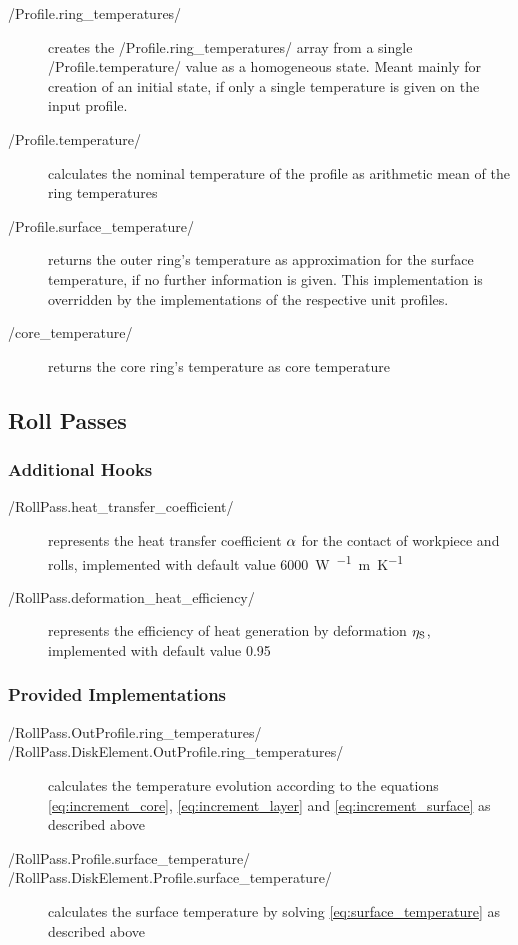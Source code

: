 \documentclass{PyRollDocs}
\begin{document}
    \begin{description}
        \item[\py/Profile.ring_temperatures/] creates the \py/Profile.ring_temperatures/ array from a single \py/Profile.temperature/ value as a homogeneous state.
        Meant mainly for creation of an initial state, if only a single temperature is given on the input profile.
        \item[\py/Profile.temperature/] calculates the nominal temperature of the profile as arithmetic mean of the ring temperatures
        \item[\py/Profile.surface_temperature/] returns the outer ring's temperature as approximation for the surface temperature, if no further information is given.
        This implementation is overridden by the implementations of the respective unit profiles.
        \item[\py/core_temperature/] returns the core ring's temperature as core temperature
    \end{description}

    \subsection{Roll Passes}

    \subsubsection{Additional Hooks}

    \begin{description}
        \item[\py/RollPass.heat_transfer_coefficient/] represents the heat transfer coefficient ${\alpha}$ for the contact of workpiece and rolls, implemented with default value \qty{6000}{\watt\per\squared\meter\per\kelvin}
        \item[\py/RollPass.deformation_heat_efficiency/] represents the efficiency of heat generation by deformation ${\eta_\mathrm{S}}$, implemented with default value \num{0.95}
    \end{description}

    \subsubsection{Provided Implementations}

    \begin{description}
        \item[\py/RollPass.OutProfile.ring_temperatures/]
        \item[\py/RollPass.DiskElement.OutProfile.ring_temperatures/] calculates the temperature evolution according to the equations \autoref{eq:increment_core}, \autoref{eq:increment_layer} and \autoref{eq:increment_surface} as described above
        \item[\py/RollPass.Profile.surface_temperature/]
        \item[\py/RollPass.DiskElement.Profile.surface_temperature/] calculates the surface temperature by solving \autoref{eq:surface_temperature} as described above
    \end{description}
\end{document}

